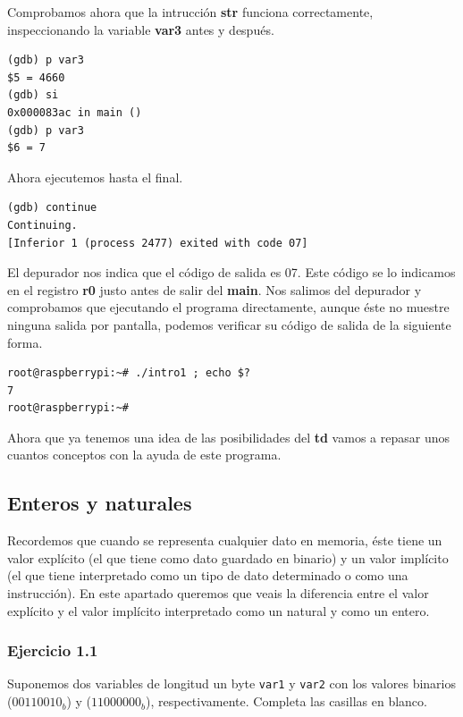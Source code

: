 Comprobamos ahora que la intrucción {\bf str} funciona correctamente,
inspeccionando la variable {\bf var3} antes y después.

\begin{lstlisting}
(gdb) p var3
$5 = 4660
(gdb) si
0x000083ac in main ()
(gdb) p var3
$6 = 7
\end{lstlisting}

Ahora ejecutemos hasta el final.

\begin{lstlisting}
(gdb) continue
Continuing.
[Inferior 1 (process 2477) exited with code 07]
\end{lstlisting}

El depurador nos indica que el código de salida es 07. Este código
se lo indicamos en el registro {\bf r0} justo antes de salir del {\bf main}.
Nos salimos del depurador y comprobamos que ejecutando el programa
directamente, aunque éste no muestre ninguna salida por pantalla, podemos
verificar su código de salida de la siguiente forma.

\begin{lstlisting}
root@raspberrypi:~# ./intro1 ; echo $?
7
root@raspberrypi:~#
\end{lstlisting}

Ahora que ya tenemos una idea de las posibilidades del {\bf td}
vamos a repasar unos cuantos conceptos con la ayuda de este programa.

\subsection{Enteros y naturales}

Recordemos que cuando se representa cualquier dato en memoria, éste tiene un
valor explícito (el que tiene como dato guardado en binario) y un
valor implícito (el que tiene interpretado como un tipo de dato
determinado o como una instrucción). En este apartado queremos que veais la
diferencia entre el valor explícito y el valor implícito interpretado como
un natural y como un entero.

\subsubsection{Ejercicio 1.1}
Suponemos dos variables de longitud un byte {\tt var1}
y {\tt var2} con los valores binarios ($00110010_b$) y ($11000000_b$),
respectivamente. Completa las casillas en blanco.

